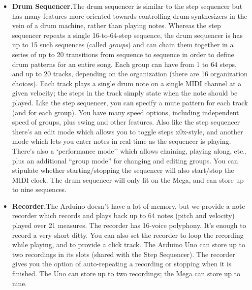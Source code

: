 \documentclass{article}
\begin{document}
\begin{itemize}
In the {\bf advanced version of the sequencer},\footnote{This is an \texttt{\#include} option found in \texttt{All.h}} which only fits on the Mega, you can also sequence CC, RPN/NRPN, Pitch Bend, Aftertouch, or PC data in addition to note data.  The advanced version also allows tracks to be played one at a time, with repeats, in a fashion more useful when controlling a monophonic or duophonic synthesizer.


\item {\bf Drum Sequencer.}\quad The drum sequencer is similar to the step sequencer but has many features more oriented towards controlling drum synthesizers in the vein of a drum machine, rather than playing notes.  Whereas the step sequencer repeats a single 16-to-64-step sequence, the drum sequencer is has up to 15 such sequences (called {\it groups}) and can chain them together in a series of up to 20 transitions from sequence to sequence in order to define drum patterns for an entire song.  Each group can have from 1 to 64 steps, and up to 20 tracks, depending on the organization (there are 16 organization choices). Each track plays a single drum note on a single MIDI channel at a given velocity; the steps in the track simply state when the note should be played.  Like the step sequencer, you can specify a mute pattern for each track (and for each group). You have many speed options, including independent speed of groups, plus swing and other features.  Also like the step sequencer there's an edit mode which allows you to toggle steps x0x-style, and another mode which lets you enter notes in real time as the sequencer is playing.  There's also a `performance mode'' which allows chaining, playing along, etc., plus an additional ``group mode'' for changing and editing groups.  You can stipulate whether starting/stopping the sequencer will also start/stop the MIDI clock.    The drum sequencer will only fit on the Mega, and can store up to nine sequences.

\item {\bf Recorder.}\quad The Arduino doesn't have a lot of memory, but we provide a note recorder which records and plays back up to 64 notes (pitch and velocity) played over 21 measures. The recorder has 16-voice polyphony.   It's enough to record a very short ditty.  You can also set the recorder to loop the recording while playing, and to provide a click track.  The Arduino Uno can store up to two recordings in its slots (shared with the Step Sequencer).  The recorder gives you the option of auto-repeating a recording or stopping when it is finished.  The Uno can store up to two recordings; the Mega can store up to nine.


\end{itemize}
\end{document}
